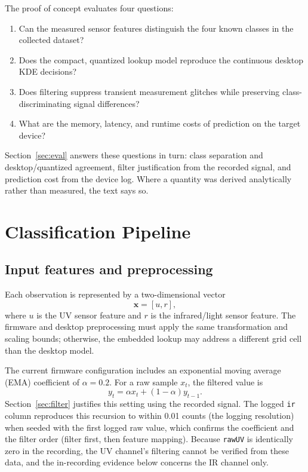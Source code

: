 \documentclass[conference]{IEEEtran}
\begin{document}
The proof of concept evaluates four questions:
\begin{enumerate}
    \item Can the measured sensor features distinguish the four known classes in the collected dataset?
    \item Does the compact, quantized lookup model reproduce the continuous desktop KDE decisions?
    \item Does filtering suppress transient measurement glitches while preserving class-discriminating signal differences?
    \item What are the memory, latency, and runtime costs of prediction on the target device?
\end{enumerate}
Section~\ref{sec:eval} answers these questions in turn: class separation and desktop/quantized agreement, filter justification from the recorded signal, and prediction cost from the device log. Where a quantity was derived analytically rather than measured, the text says so.

\section{Classification Pipeline}
\subsection{Input features and preprocessing}
Each observation is represented by a two-dimensional vector
\begin{equation}
    \mathbf{x} = [u, r],
\end{equation}
where $u$ is the UV sensor feature and $r$ is the infrared/light sensor feature. The firmware and desktop preprocessing must apply the same transformation and scaling bounds; otherwise, the embedded lookup may address a different grid cell than the desktop model.

The current firmware configuration includes an exponential moving average (EMA) coefficient of $\alpha=0.2$. For a raw sample $x_t$, the filtered value is
\begin{equation}
    y_t = \alpha x_t + (1-\alpha)y_{t-1}.
\end{equation}
Section~\ref{sec:filter} justifies this setting using the recorded signal. The logged \texttt{ir} column reproduces this recursion to within 0.01 counts (the logging resolution) when seeded with the first logged raw value, which confirms the coefficient and the filter order (filter first, then feature mapping). Because \texttt{rawUV} is identically zero in the recording, the UV channel's filtering cannot be verified from these data, and the in-recording evidence below concerns the IR channel only.
\end{document}
